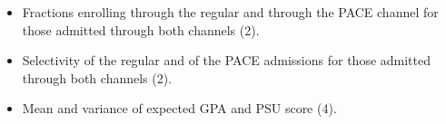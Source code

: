 \begin{enumerate}[leftmargin=5.5mm]
\begin{itemize}[leftmargin=3.5mm]
        \item Fractions enrolling through the regular and through the PACE channel for those admitted through both channels (2).
        \item Selectivity of the regular and of the PACE admissions for those admitted through both channels (2).
        \item Mean and variance of expected GPA and PSU score (4).
    \end{itemize}

    


\end{enumerate}